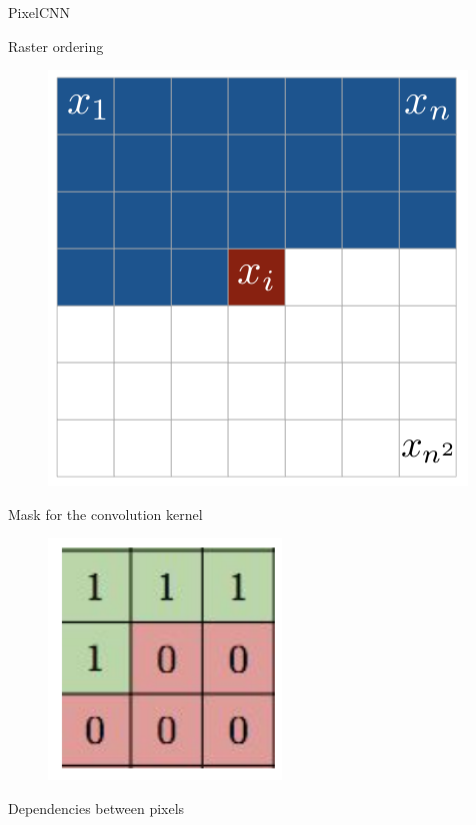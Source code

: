 \begin{frame}{PixelCNN}
	\vspace{-0.2cm}
	\begin{minipage}[t]{0.5\columnwidth}
		\begin{block}{Raster ordering}
			\begin{figure}
				\centering
		        \includegraphics[width=0.7\linewidth]{figs/pixelcnn1.png}
			\end{figure}
		\end{block}
		\vspace{-0.5cm}
		\begin{block}{Mask for the convolution kernel}
			\begin{figure}
				\centering
		        \includegraphics[width=0.35\linewidth]{figs/pixelcnn_0_1.png}
			\end{figure}
		\end{block}
	\end{minipage}%
	\begin{minipage}[t]{0.5\columnwidth}
		\begin{block}{Dependencies between pixels}
			\begin{figure}
				\centering

\end{figure}
\end{block}
\end{minipage}
\end{frame}
